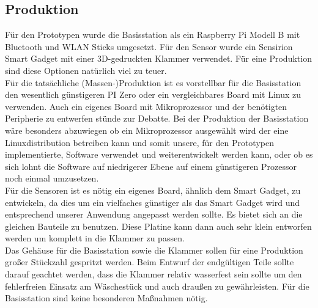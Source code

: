 \subsection{Produktion}
Für den Prototypen wurde die Basisstation als ein Raspberry Pi Modell B mit Bluetooth und WLAN Sticks umgesetzt. Für den Sensor wurde ein Sensirion Smart Gadget mit einer 3D-gedruckten Klammer verwendet. Für eine Produktion sind diese Optionen natürlich viel zu teuer. \\ 
Für die tatsächliche (Massen-)Produktion ist es vorstellbar für die Basisstation den wesentlich günstigeren PI Zero oder ein vergleichbares Board mit Linux zu verwenden. Auch ein eigenes Board mit Mikroprozessor und der benötigten Peripherie zu entwerfen stünde zur Debatte. Bei der Produktion der Basisstation wäre besonders abzuwiegen ob ein Mikroprozessor ausgewählt wird der eine Linuxdistribution betreiben kann und somit unsere, für den Prototypen implementierte, Software verwendet und weiterentwickelt werden kann, oder ob es sich lohnt die Software auf niedrigerer Ebene auf einem günstigeren Prozessor noch einmal umzusetzen. \\
Für die Sensoren ist es nötig ein eigenes Board, ähnlich dem Smart Gadget, zu entwickeln, da dies um ein vielfaches günstiger als das Smart Gadget wird und entsprechend unserer Anwendung angepasst werden sollte. Es bietet sich an die gleichen Bauteile zu benutzen. Diese Platine kann dann auch sehr klein entworfen werden um komplett in die Klammer zu passen. \\
Das Gehäuse für die Basisstation sowie die Klammer sollen für eine Produktion großer Stückzahl gespritzt werden. Beim Entwurf der endgültigen Teile sollte darauf geachtet werden, dass die Klammer relativ wasserfest sein sollte um den fehlerfreien Einsatz am Wäschestück und auch draußen zu gewährleisten. Für die Basisstation sind keine besonderen Maßnahmen nötig.
